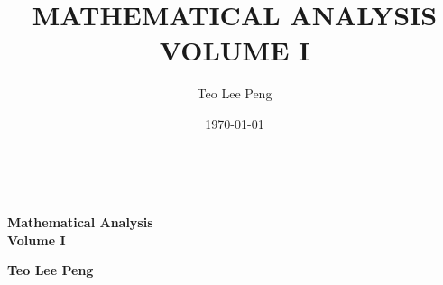 \documentclass[12pt]{tlpbook}
\newcommand{\bookauthor}{Teo Lee Peng}
\newcommand{\booktitle}{Mathematical Analysis\\Volume I}
\begin{document}
  \begin{coverpage}
~\vspace{2cm}
\begin{center}
{\fontsize{24}{28}\selectfont \textcolor{covertext}{  {\bfseries {\booktitle}} }


\vspace{6cm}

\textcolor{covertext}{{ \bfseries{\bookauthor}}}


}
\end{center}
 \end{coverpage}

\pagecolor{white}
\title{\uppercase{\booktitle}}

\author{\bookauthor}

\dedication{}


\date{\today}








\maketitle

 \frontmatter
\setcounter{page}{1}

\tableofcontents
 



 
\mainmatter


 



\backmatter

\begin{coverpage}
~
 \end{coverpage}
\end{document}

